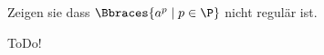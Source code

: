 
\begin{exercise}

Zeigen sie dass $\Bbraces{a^p \mid p \in \P}$ nicht regulär ist.

\end{exercise}


\begin{solution}

ToDo!

\end{solution}

